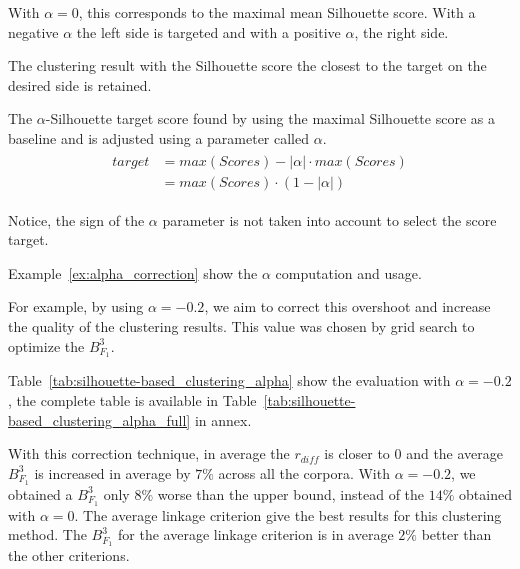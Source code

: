With $\alpha = 0$, this corresponds to the maximal mean Silhouette score.
With a negative $\alpha$ the left side is targeted and with a positive $\alpha$, the right side.

The clustering result with the Silhouette score the closest to the target on the desired side is retained.

\begin{definition}
  The $\alpha$-Silhouette target score found by using the maximal Silhouette score as a baseline and is adjusted using a parameter called $\alpha$.
  \begin{gather*}
    \begin{aligned}
    target &= max(Scores) - |\alpha| \cdot max(Scores) \\
           &= max(Scores) \cdot (1 - |\alpha|)
    \end{aligned}
  \end{gather*}

  Notice, the sign of the $\alpha$ parameter is not taken into account to select the score target.
\end{definition}

Example~\ref{ex:alpha_correction} show the $\alpha$ computation and usage.

For example, by using $\alpha = -0.2$, we aim to correct this overshoot and increase the quality of the clustering results.
This value was chosen by grid search to optimize the $B^3_{F_1}$.

Table~\ref{tab:silhouette-based_clustering_alpha} show the evaluation with $\alpha = -0.2$, the complete table is available in Table~\ref{tab:silhouette-based_clustering_alpha_full} in annex.

With this correction technique, in average the $r_{diff}$ is closer to 0 and the average $B^3_{F_1}$ is increased in average by $7\%$ across all the corpora.
With $\alpha = -0.2$, we obtained a $B^3_{F_1}$ only $8\%$ worse than the upper bound, instead of the $14\%$ obtained with $\alpha=0$.
The average linkage criterion give the best results for this clustering method.
The $B^3_{F_1}$ for the average linkage criterion is in average $2\%$ better than the other criterions.

